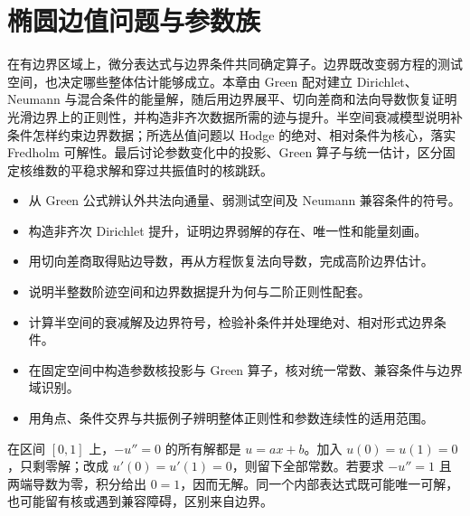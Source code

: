 
% 
% 

\chapter{椭圆边值问题与参数族}
\label{g3:ch:14}

\begin{chapterabstract}
	在有边界区域上，微分表达式与边界条件共同确定算子。边界既改变弱方程的测试空间，也决定哪些整体估计能够成立。本章由 Green 配对建立 Dirichlet、Neumann 与混合条件的能量解，随后用边界展平、切向差商和法向导数恢复证明光滑边界上的正则性，并构造非齐次数据所需的迹与提升。半空间衰减模型说明补条件怎样约束边界数据；所选丛值问题以 Hodge 的绝对、相对条件为核心，落实 Fredholm 可解性。最后讨论参数变化中的投影、Green 算子与统一估计，区分固定核维数的平稳求解和穿过共振值时的核跳跃。
\end{chapterabstract}

\begin{learninggoals}
	\begin{itemize}
		\item 从 Green 公式辨认外共法向通量、弱测试空间及 Neumann 兼容条件的符号。
		\item 构造非齐次 Dirichlet 提升，证明边界弱解的存在、唯一性和能量刻画。
		\item 用切向差商取得贴边导数，再从方程恢复法向导数，完成高阶边界估计。
		\item 说明半整数阶迹空间和边界数据提升为何与二阶正则性配套。
		\item 计算半空间的衰减解及边界符号，检验补条件并处理绝对、相对形式边界条件。
		\item 在固定空间中构造参数核投影与 Green 算子，核对统一常数、兼容条件与边界域识别。
		\item 用角点、条件交界与共振例子辨明整体正则性和参数连续性的适用范围。
	\end{itemize}
\end{learninggoals}

在区间 \([0,1]\) 上，\(-u''=0\) 的所有解都是 \(u=ax+b\)。加入 \(u(0)=u(1)=0\)，只剩零解；改成 \(u'(0)=u'(1)=0\)，则留下全部常数。若要求 \(-u''=1\) 且两端导数为零，积分给出 \(0=1\)，因而无解。同一个内部表达式既可能唯一可解，也可能留有核或遇到兼容障碍，区别来自边界。

